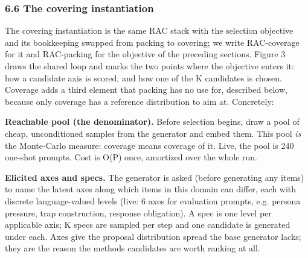 \documentclass[
  10pt,
]{article}
\theoremstyle{plain}
\theoremstyle{definition}
\begin{document}
\subsubsection{6.6 The covering
instantiation}\label{66-the-covering-instantiation}

The covering instantiation is the same RAC stack with the selection
objective and its bookkeeping swapped from packing to covering; we write
RAC-coverage for it and RAC-packing for the objective of the preceding
sections. Figure 3 draws the shared loop and marks the two points where
the objective enters it: how a candidate axis is scored, and how one of
the K candidates is chosen. Coverage adds a third element that packing
has no use for, described below, because only coverage has a reference
distribution to aim at. Concretely:

\textbf{Reachable pool (the denominator).} Before selection begins, draw
a pool of cheap, unconditioned samples from the generator and embed
them. This pool \emph{is} the Monte-Carlo measure: coverage means
coverage of it. Live, the pool is 240 one-shot prompts. Cost is O(P)
once, amortized over the whole run.

\textbf{Elicited axes and specs.} The generator is asked (before
generating any items) to name the latent axes along which items in this
domain can differ, each with discrete language-valued levels (live: 6
axes for evaluation prompts, e.g. persona pressure, trap construction,
response obligation). A spec is one level per applicable axis; K specs
are sampled per step and one candidate is generated under each. Axes
give the proposal distribution spread the base generator lacks; they are
the reason the method\textquotesingle s candidates are worth ranking at
all.
\end{document}
